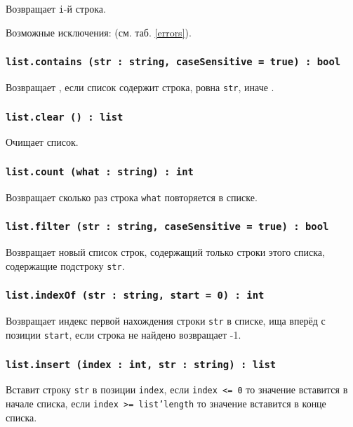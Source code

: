 Возвращает \texttt{i}-й строка.

Возможные исключения:  (см. таб. \ref{errors}).

\subsubsection{\texttt{list.contains (str : string, caseSensitive = true) : bool}}

Возвращает \true, если список содержит строка, ровна \texttt{str}, иначе \false.

\subsubsection{\texttt{list.clear () : list}}

Очищает список.

\subsubsection{\texttt{list.count (what : string) : int}}

Возвращает сколько раз строка \texttt{what} повторяется в списке.

\subsubsection{\texttt{list.filter (str : string, caseSensitive = true) : bool}}

Возвращает новый список строк, содержащий только строки этого списка, содержащие подстроку \texttt{str}. 

\subsubsection{\texttt{list.indexOf (str : string, start = 0) : int}}

Возвращает индекс первой нахождения строки \texttt{str} в списке, ища вперёд с позиции \texttt{start}, если строка не найдено возвращает -1.

\subsubsection{\texttt{list.insert (index : int, str : string) : list}}

Вставит строку \texttt{str} в позиции \texttt{index}, если \texttt{index <= 0} то значение вставится в начале списка, если \texttt{index >= list'length} то значение вставится в конце списка.

